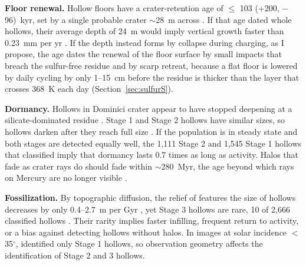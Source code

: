 \documentclass{planetary}
\begin{document}
\textbf{Floor renewal.} Hollow floors have a crater-retention age of $\leq$ 103 (+200, $-$96)~kyr, set by a single probable crater $\sim$28~m across \parencite{wang2020}. If that age dated whole hollows, their average depth of 24~m would imply vertical growth faster than 0.23~mm per yr \parencite{wang2020}. If the depth instead forms by collapse during charging, as I propose, the age dates the renewal of the floor surface by small impacts that breach the sulfur-free residue and by scarp retreat, because a flat floor is lowered by daily cycling by only 1--15~cm before the residue is thicker than the layer that crosses 368~K each day (Section~\ref{sec:sulfurS}).

\textbf{Dormancy.} Hollows in Dominici crater appear to have stopped deepening at a silicate-dominated residue \parencite{emran2025}. Stage 1 and Stage 2 hollows have similar sizes, so hollows darken after they reach full size \parencite{deutsch2025}. If the population is in steady state and both stages are detected equally well, the 1,111 Stage 2 and 1,545 Stage 1 hollows that \textcite{deutsch2025} classified imply that dormancy lasts 0.7 times as long as activity. Halos that fade as crater rays do should fade within $\sim$280~Myr, the age beyond which rays on Mercury are no longer visible \parencite{banks2017}.

\textbf{Fossilization.} By topographic diffusion, the relief of features the size of hollows decreases by only 0.4--2.7~m per Gyr \parencite{phillips2021}, yet Stage 3 hollows are rare, 10 of 2,666 classified hollows \parencite{deutsch2025}. Their rarity implies faster infilling, frequent return to activity, or a bias against detecting hollows without halos. In images at solar incidence $<$ 35$^\circ$, \textcite{deutsch2025} identified only Stage 1 hollows, so observation geometry affects the identification of Stage 2 and 3 hollows.
\end{document}
